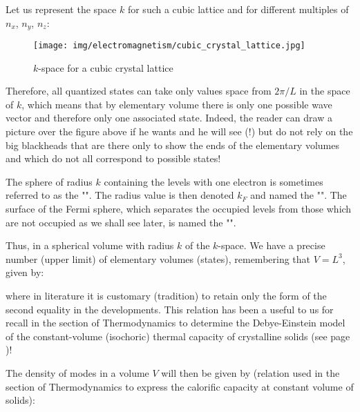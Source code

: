 	Let us represent the space $k$ for such a cubic lattice and for different multiples of $n_x$, $n_y$, $n_z$:
	\begin{figure}[H]
		\centering
		\texttt{[image: img/electromagnetism/cubic\_crystal\_lattice.jpg]}
		\caption{$k$-space for a cubic crystal lattice}
	\end{figure}
	Therefore, all quantized states can take only values space from $2\pi/L$ in the space of $k$, which means that by elementary volume there is only one possible wave vector and therefore only one associated state. Indeed, the reader can draw a picture over the figure above if he wants and he will see (!) but do not rely on the big blackheads that are there only to show the ends of the elementary volumes and which do not all correspond to possible states!
	\begin{tcolorbox}[title=Remark,colframe=black,arc=10pt]
	The sphere of radius $k$ containing the levels with one electron is sometimes referred to as the "". The radius value is then denoted $k_F$ and named the "". The surface of the Fermi sphere, which separates the occupied levels from those which are not occupied as we shall see later, is named the "".
	\end{tcolorbox}	
	Thus, in a spherical volume with radius $k$ of the $k$-space. We have a precise number (upper limit) of elementary volumes (states), remembering that $V=L^3$, given by:
	
	where in literature it is customary (tradition) to retain only the form of the second equality in the developments. This relation has been a useful to us for recall in the section of Thermodynamics to determine the Debye-Einstein model of the constant-volume (isochoric) thermal capacity of crystalline solids (see page \pageref{calorific capacities})!

	The density of modes in a volume $V$ will then be given by (relation used in the section of Thermodynamics to express the calorific capacity at constant volume of solids):
	
